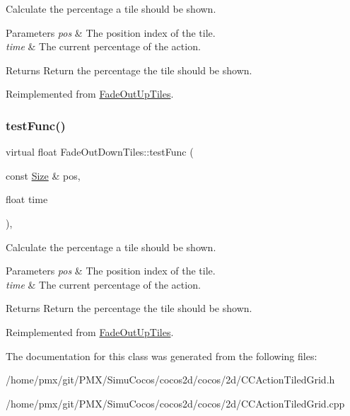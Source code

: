 Calculate the percentage a tile should be shown. 


\begin{DoxyParams}{Parameters}
{\em pos} & The position index of the tile. \\
\hline
{\em time} & The current percentage of the action. \\
\hline
\end{DoxyParams}
\begin{DoxyReturn}{Returns}
Return the percentage the tile should be shown. 
\end{DoxyReturn}


Reimplemented from \hyperlink{classFadeOutUpTiles_a8a0a0c36e5c02a518dc649b2ec7d8864}{Fade\+Out\+Up\+Tiles}.

\mbox{\label{classFadeOutDownTiles_a650db33238577e696174930b01d06045}} 
\subsubsection{\texorpdfstring{test\+Func()}{testFunc()}\hspace{0.1cm}{\footnotesize\ttfamily [2/2]}}
{\footnotesize\ttfamily virtual float Fade\+Out\+Down\+Tiles\+::test\+Func (\begin{DoxyParamCaption}\item[{const \hyperlink{classSize}{Size} \&}]{pos,  }\item[{float}]{time }\end{DoxyParamCaption})\hspace{0.3cm}{\ttfamily [override]}, {\ttfamily [virtual]}}



Calculate the percentage a tile should be shown. 


\begin{DoxyParams}{Parameters}
{\em pos} & The position index of the tile. \\
\hline
{\em time} & The current percentage of the action. \\
\hline
\end{DoxyParams}
\begin{DoxyReturn}{Returns}
Return the percentage the tile should be shown. 
\end{DoxyReturn}


Reimplemented from \hyperlink{classFadeOutUpTiles_a8a0a0c36e5c02a518dc649b2ec7d8864}{Fade\+Out\+Up\+Tiles}.



The documentation for this class was generated from the following files\+:\begin{DoxyCompactItemize}
\item 
/home/pmx/git/\+P\+M\+X/\+Simu\+Cocos/cocos2d/cocos/2d/C\+C\+Action\+Tiled\+Grid.\+h\item 
/home/pmx/git/\+P\+M\+X/\+Simu\+Cocos/cocos2d/cocos/2d/C\+C\+Action\+Tiled\+Grid.\+cpp\end{DoxyCompactItemize}
